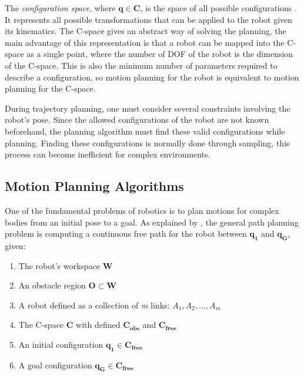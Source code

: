 The \textit{configuration space}, where \( \bm{q} \in  \bm{C} \), is the space of all possible configurations \citep{Handbook}. It represents all possible transformations that can be applied to the robot given its kinematics. The C-space gives an abstract way of solving the planning, the main advantage of this representation is that a robot can be mapped into the C-space as a single point, where the number of DOF of the robot is the dimension of the C-space. This is also the minimum number of parameters required to describe a configuration, so motion planning for the robot is equivalent to motion planning for the C-space.

During trajectory planning, one must consider several constraints involving the robot's pose. Since the allowed configurations of the robot are not known beforehand, the planning algorithm must find these valid configurations while planning. Finding these configurations is normally done through sampling, this process can become inefficient for complex environments.

%

\subsection{Motion Planning Algorithms}

One of the fundamental problems of robotics is to plan motions for complex bodies from an initial pose to a goal. As explained by \citet{Handbook}, the general path planning problem is computing a continuous free path for the robot between $\bm{q_{1}}$ and $\bm{q_{G}}$, given:
\begin{enumerate}
	\vspace{-5pt}
	\item The robot's workspace $\bm{W}$
	\vspace{-5pt}
	\item An obstacle region $\bm{O} \subset \bm{W}$
	\vspace{-5pt}
	\item A robot defined as a collection of \textit{m} links: $A_{1}, A_{2}, ... , A_{m}$
	\vspace{-5pt}
	\item The C-space $\bm{C}$ with defined $\bm{C_{obs}}$ and $\bm{C_{free}}$
	\vspace{-5pt} 
	\item An initial configuration $\bm{q_{1}} \in  \bm{C_{free}}$
	\vspace{-5pt} 
	\item A goal configuration $\bm{q_{G}} \in  \bm{C_{free}}$
\end{enumerate}

